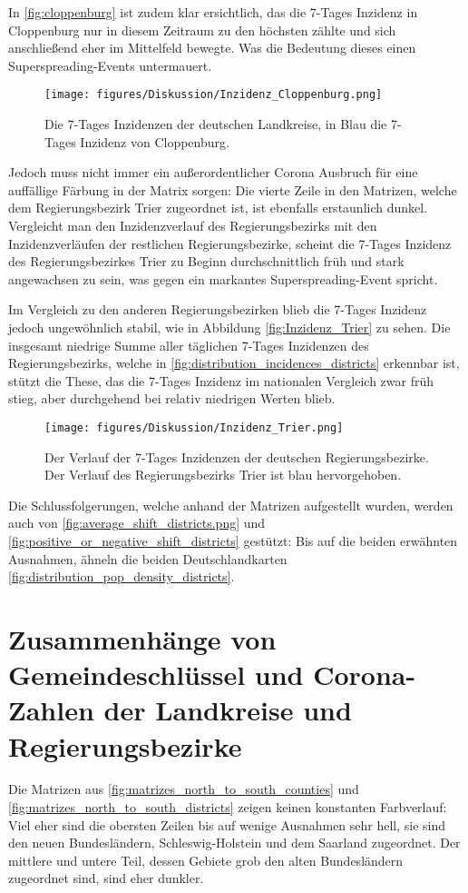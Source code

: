 In \autoref{fig:cloppenburg} ist zudem klar ersichtlich, das die 7-Tages Inzidenz in Cloppenburg nur in diesem Zeitraum zu den höchsten zählte und sich anschließend eher im Mittelfeld bewegte. Was die Bedeutung dieses einen Superspreading-Events untermauert.
\begin{figure}
    \centering
    \texttt{[image: figures/Diskussion/Inzidenz\_Cloppenburg.png]}
    \caption{Die 7-Tages Inzidenzen der deutschen Landkreise, in Blau die 7-Tages Inzidenz von Cloppenburg.}
    \label{fig:cloppenburg}
\end{figure}

Jedoch muss nicht immer ein außerordentlicher Corona Ausbruch für eine auffällige Färbung in der Matrix sorgen: Die vierte Zeile in den Matrizen, welche dem Regierungsbezirk Trier zugeordnet ist, ist ebenfalls erstaunlich dunkel.
Vergleicht man den Inzidenzverlauf des Regierungsbezirks mit den Inzidenzverläufen der restlichen Regierungsbezirke, scheint die 7-Tages Inzidenz des Regierungsbezirkes Trier zu Beginn durchschnittlich früh und stark angewachsen zu sein, was gegen ein markantes Superspreading-Event spricht.

Im Vergleich zu den anderen Regierungsbezirken blieb die 7-Tages Inzidenz jedoch ungewöhnlich stabil, wie in Abbildung \autoref{fig:Inzidenz_Trier} zu sehen. Die insgesamt niedrige Summe aller täglichen 7-Tages Inzidenzen des Regierungsbezirks, welche in \autoref{fig:distribution_incidences_districts} erkennbar ist, stützt die These, das die 7-Tages Inzidenz im nationalen Vergleich zwar früh stieg, aber durchgehend bei relativ niedrigen Werten blieb.

\begin{figure}[H]
    \centering
    \texttt{[image: figures/Diskussion/Inzidenz\_Trier.png]}
    \caption{Der Verlauf der 7-Tages Inzidenzen der deutschen Regierungsbezirke. Der Verlauf des Regierungsbezirks Trier ist blau hervorgehoben.}
    \label{fig:Inzidenz_Trier}
\end{figure}



Die Schlussfolgerungen, welche anhand der Matrizen aufgestellt wurden, werden auch von \autoref{fig:average_shift_districts.png} und \autoref{fig:positive_or_negative_shift_districts} gestützt: Bis auf die beiden erwähnten Ausnahmen, ähneln die beiden Deutschlandkarten \autoref{fig:distribution_pop_density_districts}.

\section{Zusammenhänge von Gemeindeschlüssel und Corona-Zahlen der Landkreise und Regierungsbezirke}
Die Matrizen aus \autoref{fig:matrizes_north_to_south_counties} und \autoref{fig:matrizes_north_to_south_districts} zeigen keinen konstanten Farbverlauf: Viel eher sind die obersten Zeilen bis auf wenige Ausnahmen sehr hell, sie sind den neuen Bundesländern, Schleswig-Holstein und dem Saarland zugeordnet. Der mittlere und untere Teil, dessen Gebiete grob den alten Bundesländern zugeordnet sind, sind eher dunkler.

